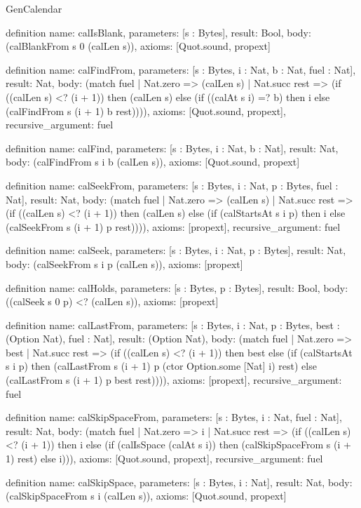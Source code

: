\begin{lexlean}{GenCalendar}
\begin{semanticmodule}
definition{
  name: calIsBlank,
  parameters: [s : Bytes],
  result: Bool,
  body: (calBlankFrom s 0 (calLen s)),
  axioms: [Quot.sound, propext]
}

definition{
  name: calFindFrom,
  parameters: [s : Bytes, i : Nat, b : Nat, fuel : Nat],
  result: Nat,
  body: (match fuel
    | Nat.zero => (calLen s)
    | Nat.succ rest => (if ((calLen s) <? (i + 1)) then (calLen s) else (if ((calAt s i) =? b) then i else (calFindFrom s (i + 1) b rest)))),
  axioms: [Quot.sound, propext],
  recursive_argument: fuel
}

definition{
  name: calFind,
  parameters: [s : Bytes, i : Nat, b : Nat],
  result: Nat,
  body: (calFindFrom s i b (calLen s)),
  axioms: [Quot.sound, propext]
}

definition{
  name: calSeekFrom,
  parameters: [s : Bytes, i : Nat, p : Bytes, fuel : Nat],
  result: Nat,
  body: (match fuel
    | Nat.zero => (calLen s)
    | Nat.succ rest => (if ((calLen s) <? (i + 1)) then (calLen s) else (if (calStartsAt s i p) then i else (calSeekFrom s (i + 1) p rest)))),
  axioms: [propext],
  recursive_argument: fuel
}

definition{
  name: calSeek,
  parameters: [s : Bytes, i : Nat, p : Bytes],
  result: Nat,
  body: (calSeekFrom s i p (calLen s)),
  axioms: [propext]
}

definition{
  name: calHolds,
  parameters: [s : Bytes, p : Bytes],
  result: Bool,
  body: ((calSeek s 0 p) <? (calLen s)),
  axioms: [propext]
}

definition{
  name: calLastFrom,
  parameters: [s : Bytes, i : Nat, p : Bytes, best : (Option Nat), fuel : Nat],
  result: (Option Nat),
  body: (match fuel
    | Nat.zero => best
    | Nat.succ rest => (if ((calLen s) <? (i + 1)) then best else (if (calStartsAt s i p) then (calLastFrom s (i + 1) p (ctor Option.some [Nat] i) rest) else (calLastFrom s (i + 1) p best rest)))),
  axioms: [propext],
  recursive_argument: fuel
}

definition{
  name: calSkipSpaceFrom,
  parameters: [s : Bytes, i : Nat, fuel : Nat],
  result: Nat,
  body: (match fuel
    | Nat.zero => i
    | Nat.succ rest => (if ((calLen s) <? (i + 1)) then i else (if (calIsSpace (calAt s i)) then (calSkipSpaceFrom s (i + 1) rest) else i))),
  axioms: [Quot.sound, propext],
  recursive_argument: fuel
}

definition{
  name: calSkipSpace,
  parameters: [s : Bytes, i : Nat],
  result: Nat,
  body: (calSkipSpaceFrom s i (calLen s)),
  axioms: [Quot.sound, propext]
}


\end{semanticmodule}
\end{lexlean}
